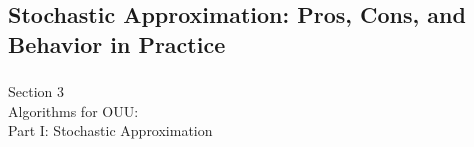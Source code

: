 \documentclass[aspectratio=169,xcolor=dvipsnames,10pt]{beamer}
\begin{document}


\subsection{Stochastic Approximation: Pros, Cons, and Behavior in Practice}
\begin{frame}\frametitle{}
\begin{center}\Large
Section 3\\
Algorithms for OUU:\\
Part I: Stochastic Approximation
\end{center}
\end{frame}
\end{document}
